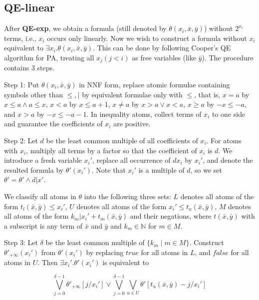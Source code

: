 
\subsection{QE-linear}

After \textbf{QE-exp}, 
we obtain a formula (still denoted by $\theta(x_i,\bar{x},\bar{y})$) without $2^{x_i}$ terms,
i.e., $x_i$ occurs only linearly.
Now we wish to construct a formula without $x_i$ equivalent to $\exists x_i.\theta(x_i,\bar{x},\bar{y})$.
This can be done by 
following Cooper's QE algorithm for PA,
treating all $x_j (j<i)$ as free variables (like $\bar{y}$).
The procedure contains 3 steps.

Step 1: Put $\theta(x_i,\bar{x},\bar{y})$ in NNF form, replace atomic formulae containing symbols other than $\le,|$ by equivalent formulae only with $\le$, that is, $x=a$ by $x\le a \wedge a\le x$, $x< a$ by $x\le a+1$, $x\neq a$ by $x>a \vee x<a$,  $x\geq a$ by $-x \le -a$, and $x>a$ by $-x \le -a-1$.
In inequality atoms, collect terms of $x_i$
to one side and guarantee the coefficients of $x_i$ are positive.

Step 2: Let $d$ be the least common multiple of all coefficients of $x_i$. 
For atoms with $x_i$, multiply all terms by a factor so that the coefficient of $x_i$ is $d$.
We introduce a fresh variable $x_i'$, replace all occurrence of $dx_i$ by $x_i'$,
and denote the resulted formula by $\theta'(x_i')$.
Note that $x_i'$ is a multiple of $d$, 
so we set $\theta'=\theta'\wedge d|x'$.

We classify all atoms in $\theta$ into the following three sets:  
$L$ denotes all atoms of the form $t_l(\bar{x},\bar{y})\le x_i'$,
$U$ denotes all atoms of the form $x_i'\le t_u(\bar{x},\bar{y})$,
$M$ denotes all atoms of the form $k_m|x_i'+t_m(\bar{x},\bar{y})$ and their negations,
where $t(\bar{x},\bar{y})$ with a subscript is any term of $\bar{x}$ and $\bar{y}$ and 
$k_m \in \mathbb{N}$ for $m\in M$. %

Step 3: Let $\delta$ be the least common multiple of $\{k_m \mid m\in M\}$.
Construct $\theta'_{+\infty}(x_i')$ from $\theta'(x_i')$ by  
 replacing $\textit{true}$ for all atoms in $L$,
and $\textit{false}$ for all atoms in  $U$.
Then $\exists x_i'.\theta'(x_i')$
is equivalent to

$$\bigvee_{j=0}^{\delta-1} \theta'_{+\infty}[j/x_i'] \vee 
\bigvee_{j=0}^{\delta-1} \bigvee_{u\in U} \theta'[t_u(\bar{x},\bar{y})-j/x_i']$$

